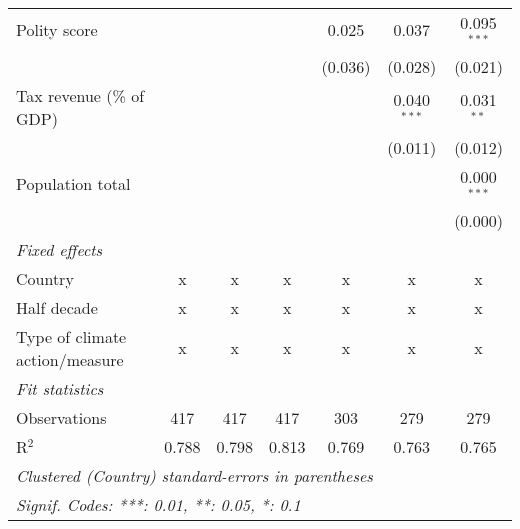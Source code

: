 \begin{tabular}{lcccccc}
   Polity score                                                     &               &                &                & 0.025          & 0.037          & 0.095$^{***}$\\   
                                                                    &               &                &                & (0.036)        & (0.028)        & (0.021)\\   
   Tax revenue (\% of GDP)                                          &               &                &                &                & 0.040$^{***}$  & 0.031$^{**}$\\   
                                                                    &               &                &                &                & (0.011)        & (0.012)\\   
   Population total                                                 &               &                &                &                &                & 0.000$^{***}$\\   
                                                                    &               &                &                &                &                & (0.000)\\   
   \emph{Fixed effects}\\
   Country                                                          & x             & x              & x              & x              & x              & x\\  
   Half decade                                                      & x             & x              & x              & x              & x              & x\\  
   Type of climate action/measure                                   & x             & x              & x              & x              & x              & x\\  
   \midrule \emph{Fit statistics}\\
   Observations                                                     & 417           & 417            & 417            & 303            & 279            & 279\\  
   R$^2$                                                            & 0.788         & 0.798          & 0.813          & 0.769          & 0.763          & 0.765\\  
   \midrule
   \multicolumn{7}{l}{\emph{Clustered (Country) standard-errors in parentheses}}\\
   \multicolumn{7}{l}{\emph{Signif. Codes: ***: 0.01, **: 0.05, *: 0.1}}\\
\end{tabular}
\par\endgroup


